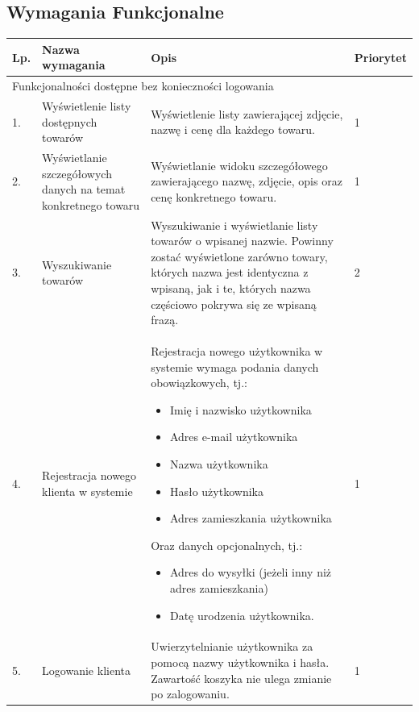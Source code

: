\documentclass[10pt,a4paper]{article}
\begin{document}
	  \subsection{Wymagania Funkcjonalne}
	  	\flushleft
          \begin{longtable}{| m{0.5cm} | m{4cm} | p{6cm} | m{1.5cm} |}
            \hline
            Lp. & Nazwa wymagania 						& Opis 										& Priorytet\\ \hline
            \multicolumn{4}{|l|}{Funkcjonalności dostępne bez konieczności logowania}\\ \hline
            1.  & Wyświetlenie listy dostępnych towarów & Wyświetlenie listy zawierającej zdjęcie, 
            											  nazwę i cenę dla każdego towaru.			& 1\\ \hline
            2.  & Wyświetlanie szczegółowych danych na 
            	  temat konkretnego towaru				& Wyświetlanie widoku szczegółowego 
            	  										  zawierającego nazwę, zdjęcie, opis oraz
            	  										  cenę konkretnego towaru.					& 1\\ \hline
			3.  & Wyszukiwanie towarów					& Wyszukiwanie i wyświetlanie listy 
														  towarów o wpisanej nazwie. Powinny zostać 
														  wyświetlone zarówno towary, których nazwa 
														  jest identyczna z wpisaną, jak i te,
														  których nazwa częściowo pokrywa się 
														  ze wpisaną frazą.							& 2\\ \hline
			4.	& Rejestracja nowego klienta w systemie & Rejestracja nowego użytkownika w systemie
														  wymaga podania danych obowiązkowych, tj.:
														  
														  \begin{itemize}[label={--}]
														  \item Imię i nazwisko użytkownika
														  \item Adres e-mail użytkownika
														  \item Nazwa użytkownika
														  \item Hasło użytkownika
														  \item Adres zamieszkania użytkownika
														  \end{itemize}
														  Oraz danych opcjonalnych, tj.:
														  \begin{itemize}[label={--}]
														  \item Adres do wysyłki
														      (jeżeli inny niż adres zamieszkania)
														  \item Datę urodzenia użytkownika.
														  \end{itemize}								& 1\\ \hline
			5. & Logowanie klienta						& Uwierzytelnianie użytkownika za pomocą 
														  nazwy użytkownika i hasła. 
														  Zawartość koszyka nie ulega zmianie 
														  po zalogowaniu.							& 1\\ \hline
														  

\end{longtable}
\end{document}
